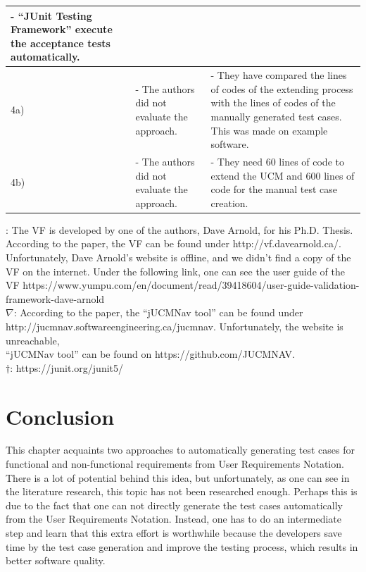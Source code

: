 \begin{landscape}
\begin{small}
\begin{table}
\begin{longtable}[h]{>{\raggedright}p{0.5cm}|>{}p{11cm}|>{}p{11cm}}
			- \enquote{JUnit Testing Framework} execute the acceptance tests automatically.
			\\
			\hline %
			4a)
			& - The authors did not evaluate the approach. 
			& - They have compared the lines of codes of the extending process with the lines of codes of the manually generated test cases. This was made on example software. 
			\\ \hline
			4b)
			&- The authors did not evaluate the approach. &
			- They need 60 lines of code to extend the UCM and 600 lines of code for the manual test case creation. \\
			\hline %
		\end{longtable}
		\qquad \qquad *: The VF is developed by one of the authors, Dave Arnold, for his Ph.D. Thesis. According to the paper, the VF can be found under http://vf.davearnold.ca/.\\
		\null \qquad \qquad \quad Unfortunately, Dave Arnold's website is offline, and we didn't find a copy of the VF on the internet. Under the following link, one can see the user guide of the \\
		\null \qquad \qquad \quad VF https://www.yumpu.com/en/document/read/39418604/user-guide-validation-framework-dave-arnold \\
		\null \qquad \qquad $\nabla$: According to the paper, the \enquote{jUCMNav tool} can be found under http://jucmnav.softwareengineering.ca/jucmnav. Unfortunately, the website is unreachable, \\
		\null \qquad \qquad \quad \enquote{jUCMNav tool} can be found on https://github.com/JUCMNAV.\\
		\null \qquad \qquad $\dagger$: https://junit.org/junit5/
		\label{tab:08_syntheseMatrix2}
	\end{table}
	\end{small}
\end{landscape}
\restoregeometry
\section{Conclusion}

This chapter acquaints two approaches to automatically generating test cases for functional and non-functional requirements from User Requirements Notation. There is a lot of potential behind this idea, but unfortunately, as one can see in the literature research, this topic has not been researched enough. Perhaps this is due to the fact that one can not directly generate the test cases automatically from the User Requirements Notation. Instead, one has to do an intermediate step and learn that this extra effort is worthwhile because the developers save time by the test case generation and improve the testing process, which results in better software quality. 

